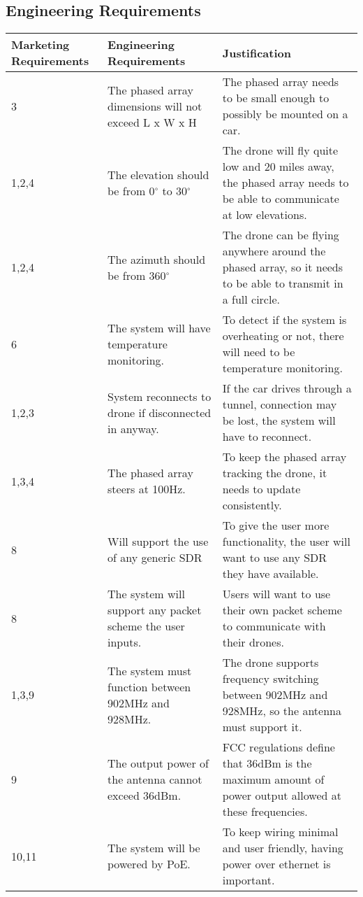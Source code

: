 \documentclass[ProjectRequirements.tex]{subfiles}
\begin{document}
	\subsection{Engineering Requirements}
	\begin{center}
	\begin{tabular}{| p{2.3cm} | p{5cm} | p{7cm} |} \hline
		Marketing Requirements & Engineering Requirements & Justification \\ \hline \hline
		3 & The phased array dimensions will not exceed L x W x H & The phased array needs to be small enough to possibly be mounted on a car. \\ \hline
		1,2,4 & The elevation should be from 0$^{\circ}$ to 30$^{\circ}$ & The drone will fly quite low and 20 miles away, the phased array needs to be able to communicate at low elevations.\\\hline
		1,2,4 & The azimuth should be from 360$^{\circ}$ & The drone can be flying anywhere around the phased array, so it needs to be able to transmit in a full circle. \\\hline
		6 & The system will have temperature monitoring. & To detect if the system is overheating or not, there will need to be temperature monitoring. \\\hline
		1,2,3 & System reconnects to drone if disconnected in anyway. & If the car drives through a tunnel, connection may be lost, the system will have to reconnect. \\\hline
		1,3,4  & The phased array steers at 100Hz. & To keep the phased array tracking the drone, it needs to update consistently. \\\hline
		8 & Will support the use of any generic SDR & To give the user more functionality, the user will want to use any SDR they have available.\\\hline
		8 & The system will support any packet scheme the user inputs. & Users will want to use their own packet scheme to communicate with their drones.\\\hline
		1,3,9 & The system must function between 902MHz and 928MHz. & The drone supports frequency switching between 902MHz and 928MHz, so the antenna must support it.\\\hline
		 9 & The output power of the antenna cannot exceed 36dBm. & FCC regulations define that 36dBm is the maximum amount of power output allowed at these frequencies.\\\hline
		10,11 & The system will be powered by PoE. & To keep wiring minimal and user friendly, having power over ethernet is important. \\\hline

\end{tabular}
\end{center}
\end{document}
